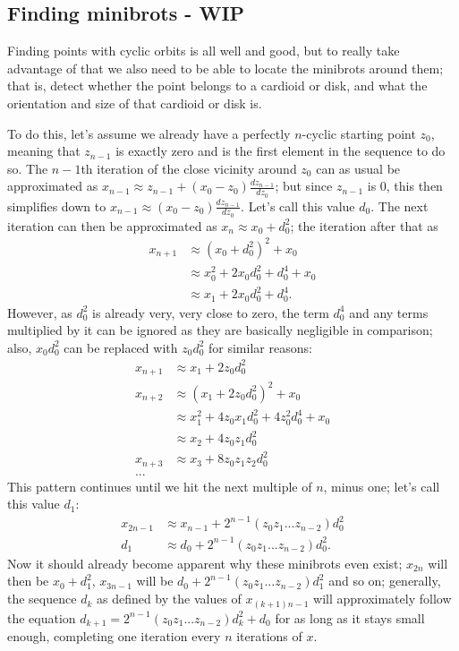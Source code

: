 \documentclass[12pt,a4paper]{article}
\newcommand{\eqar}[1]{\begin{align*} #1 \end{align*}}
\begin{document}
\subsection{Finding minibrots - WIP}

Finding points with cyclic orbits is all well and good, but to really take advantage of that we also need to be able to locate the minibrots around them; that is, detect whether the point belongs to a cardioid or disk, and what the orientation and size of that cardioid or disk is.

To do this, let's assume we already have a perfectly $n$-cyclic starting point $z_0$, meaning that $z_{n-1}$ is exactly zero and is the first element in the sequence to do so. The $n-1$th iteration of the close vicinity around $z_0$ can as usual be approximated as $x_{n-1}\approx z_{n-1}+(x_0-z_0)\frac{dz_{n-1}}{dz_0}$; but since $z_{n-1}$ is $0$, this then simplifies down to $x_{n-1}\approx(x_0-z_0)\frac{dz_{n-1}}{dz_0}$. Let's call this value $d_0$. The next iteration can then be approximated as $x_{n}\approx x_0+d_0^2$; the iteration after that as
\eqar{
	x_{n+1} &\approx (x_0+d_0^2)^2+x_0\\
	&\approx x_0^2+2x_0d_0^2+d_0^4+x_0\\
	&\approx x_1+2x_0d_0^2+d_0^4.
}
However, as $d_0^2$ is already very, very close to zero, the term $d_0^4$ and any terms multiplied by it can be ignored as they are basically negligible in comparison; also, $x_0d_0^2$ can be replaced with $z_0d_0^2$ for similar reasons:
\eqar{
	x_{n+1} &\approx x_1+2z_0d_0^2\\
	x_{n+2} &\approx (x_1+2z_0d_0^2)^2+x_0\\
	&\approx x_1^2+4z_0x_1d_0^2+4z_0^2d_0^4+x_0\\
	&\approx x_2+4z_0z_1d_0^2\\
	x_{n+3} &\approx x_3+8z_0z_1z_2d_0^2\\
	...
}
This pattern continues until we hit the next multiple of $n$, minus one; let's call this value $d_1$:
\eqar{
	x_{2n-1} &\approx x_{n-1}+2^{n-1}(z_0z_1...z_{n-2})d_0^2\\
	d_1 &\approx d_0+2^{n-1}(z_0z_1...z_{n-2})d_0^2.
}
Now it should already become apparent why these minibrots even exist; $x_{2n}$ will then be $x_0+d_1^2$, $x_{3n-1}$ will be $d_0+2^{n-1}(z_0z_1...z_{n-2})d_1^2$ and so on; generally, the sequence $d_k$ as defined by the values of $x_{(k+1)n-1}$ will approximately follow the equation $d_{k+1}=2^{n-1}(z_0z_1...z_{n-2})d_k^2+d_0$ for as long as it stays small enough, completing one iteration every $n$ iterations of $x$.
\end{document}
